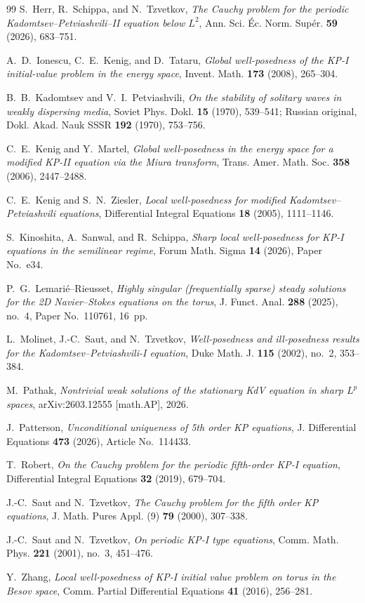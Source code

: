 \documentclass[12pt,reqno,letterpaper]{amsart}
\numberwithin{equation}{section}
\theoremstyle{definition}
\begin{document}
\begin{thebibliography}{99}
S.~Herr, R.~Schippa, and N.~Tzvetkov,
\emph{The Cauchy problem for the periodic Kadomtsev--Petviashvili--II
equation below $L^2$},
Ann. Sci. \'Ec. Norm. Sup\'er. \textbf{59} (2026), 683--751.

A.~D.~Ionescu, C.~E.~Kenig, and D.~Tataru,
\emph{Global well-posedness of the KP-I initial-value problem in the energy
space}, Invent. Math. \textbf{173} (2008), 265--304.

B.~B.~Kadomtsev and V.~I.~Petviashvili,
\emph{On the stability of solitary waves in weakly dispersing media},
Soviet Phys. Dokl. \textbf{15} (1970), 539--541; Russian original,
Dokl. Akad. Nauk SSSR \textbf{192} (1970), 753--756.

C.~E.~Kenig and Y.~Martel,
\emph{Global well-posedness in the energy space for a modified KP-II
equation via the Miura transform},
Trans. Amer. Math. Soc. \textbf{358} (2006), 2447--2488.

C.~E.~Kenig and S.~N.~Ziesler,
\emph{Local well-posedness for modified Kadomtsev--Petviashvili equations},
Differential Integral Equations \textbf{18} (2005), 1111--1146.

S.~Kinoshita, A.~Sanwal, and R.~Schippa,
\emph{Sharp local well-posedness for KP-I equations in the semilinear regime},
Forum Math. Sigma \textbf{14} (2026), Paper No.~e34.

P.~G.~Lemari\'e--Rieusset,
\emph{Highly singular (frequentially sparse) steady solutions for the
2D Navier--Stokes equations on the torus},
J. Funct. Anal. \textbf{288} (2025), no.~4,
Paper No.~110761, 16~pp.

L.~Molinet, J.-C.~Saut, and N.~Tzvetkov,
\emph{Well-posedness and ill-posedness results for the
Kadomtsev--Petviashvili-I equation},
Duke Math. J. \textbf{115} (2002), no.~2, 353--384.

M.~Pathak,
\emph{Nontrivial weak solutions of the stationary KdV equation in sharp
$L^p$ spaces},
arXiv:2603.12555 [math.AP], 2026.

J.~Patterson,
\emph{Unconditional uniqueness of 5th order KP equations},
J. Differential Equations \textbf{473} (2026), Article No.~114433.

T.~Robert,
\emph{On the Cauchy problem for the periodic fifth-order KP-I equation},
Differential Integral Equations \textbf{32} (2019), 679--704.

J.-C.~Saut and N.~Tzvetkov,
\emph{The Cauchy problem for the fifth order KP equations},
J. Math. Pures Appl. (9) \textbf{79} (2000), 307--338.

J.-C.~Saut and N.~Tzvetkov,
\emph{On periodic KP-I type equations},
Comm. Math. Phys. \textbf{221} (2001), no.~3, 451--476.

Y.~Zhang,
\emph{Local well-posedness of KP-I initial value problem on torus in the
Besov space}, Comm. Partial Differential Equations \textbf{41} (2016),
256--281.

\end{thebibliography}
\end{document}
